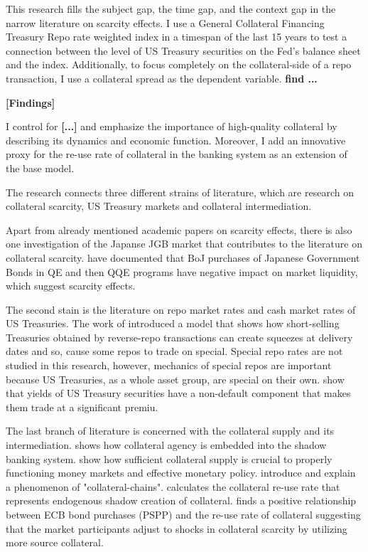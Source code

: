\documentclass[11pt,a4paper,english,oneside]{article}
\begin{document}
This research fills the subject gap, the time gap, and the context gap in the narrow literature on scarcity effects. I use a General Collateral Financing Treasury Repo rate weighted index in a timespan of the last 15 years to test a connection between the level of US Treasury securities on the Fed's balance sheet and the index. Additionally, to focus completely on the collateral-side of a repo transaction, I use a collateral spread as the dependent variable. \citet{nyborg2019b} \textbf{find ...}

\textbf{[Findings]}

I control for \textbf{[...]} and emphasize the importance of high-quality collateral by describing its dynamics and economic function. Moreover, I add an innovative proxy for the re-use rate of collateral in the banking system as an extension of the base model.

The research connects three different strains of literature, which are research on collateral scarcity, US Treasury markets and collateral intermediation.

Apart from already mentioned academic papers on scarcity effects, there is also one investigation of the Japanse JGB market that contributes to the literature on collateral scarcity. \citet{han2018} have documented that BoJ purchases of Japanese Government Bonds in QE and then QQE programs have negative impact on market liquidity, which suggest scarcity effects.

The second stain is the literature on repo market rates and cash market rates of US Treasuries. The work of \citet{duffie1996} introduced a model that shows how short-selling Treasuries obtained by reverse-repo transactions can create squeezes at delivery dates and so, cause some repos to trade on special. Special repo rates are not studied in this research, however, mechanics of special repos are important because US Treasuries, as a whole asset group, are special on their own. \citet{krishnamurthy2012} show that yields of US Treasury securities have a non-default component that makes them trade at a significant premiu. 

The last branch of literature is concerned with the collateral supply and its intermediation. \citet{singh2011} shows how collateral agency is embedded into the shadow banking system. \citet{sissoko2020} show how sufficient collateral supply is crucial to properly functioning money markets and effective monetary policy. \citet{singh2012} introduce and explain a phenomenon of "collateral-chains". \citet{singh2017} calculates the collateral re-use rate that represents endogenous shadow creation of collateral. \citet{jank2020} finds a positive relationship between ECB bond purchases (PSPP) and the re-use rate of collateral suggesting that the market participants adjust to shocks in collateral scarcity by utilizing more source collateral.
\end{document}
